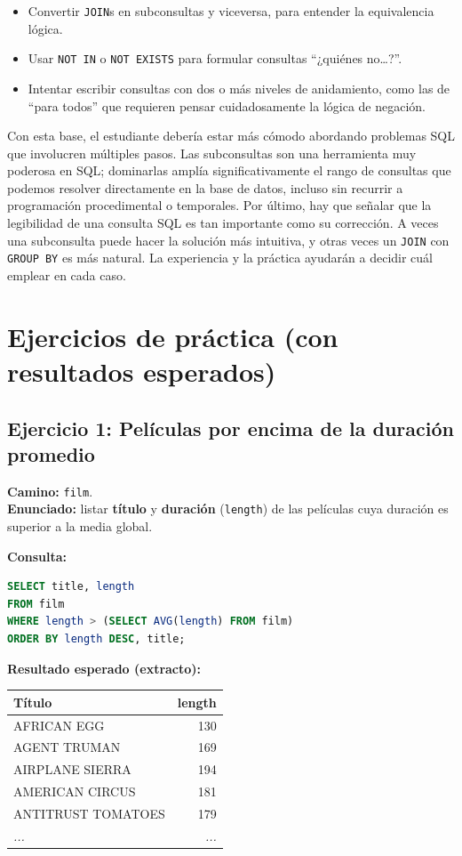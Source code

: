 \documentclass[12pt,a4paper]{article}
\begin{document}
\begin{itemize}
\item Convertir \texttt{JOIN}s en subconsultas y viceversa, para entender la equivalencia lógica.
\item Usar \texttt{NOT IN} o \texttt{NOT EXISTS} para formular consultas “¿quiénes no…?”.
\item Intentar escribir consultas con dos o más niveles de anidamiento, como las de “para todos” que requieren pensar cuidadosamente la lógica de negación.
\end{itemize} Con esta base, el estudiante debería estar más cómodo abordando problemas SQL que involucren múltiples pasos.
%
Las subconsultas son una herramienta muy poderosa en SQL; dominarlas amplía significativamente el rango de consultas que podemos resolver directamente en la base de datos, incluso sin recurrir a programación procedimental o temporales.
%
Por último, hay que señalar que la legibilidad de una consulta SQL es tan importante como su corrección.
%
A veces una subconsulta puede hacer la solución más intuitiva, y otras veces un \texttt{JOIN} con \texttt{GROUP BY} es más natural.
%
La experiencia y la práctica ayudarán a decidir cuál emplear en cada caso.


\section{Ejercicios de práctica (con resultados esperados)}

\subsection*{Ejercicio 1: Películas por encima de la duración promedio}
\textbf{Camino:} \texttt{film}. \\
\textbf{Enunciado:} listar \textbf{título} y \textbf{duración} (\texttt{length}) de las películas cuya duración es superior a la media global.

\textbf{Consulta:}
\begin{lstlisting}[language=SQL]
SELECT title, length
FROM film
WHERE length > (SELECT AVG(length) FROM film)
ORDER BY length DESC, title;
\end{lstlisting}

\textbf{Resultado esperado (extracto):}
\begin{center}
\begin{tabular}{l r}
\hline
Título & length \\
\hline
AFRICAN EGG             & 130 \\
AGENT TRUMAN            & 169 \\
AIRPLANE SIERRA         & 194 \\
AMERICAN CIRCUS         & 181 \\
ANTITRUST TOMATOES      & 179 \\
\textit{...}            & \textit{...} \\
\hline
\end{tabular}
\end{center}
\end{document}
